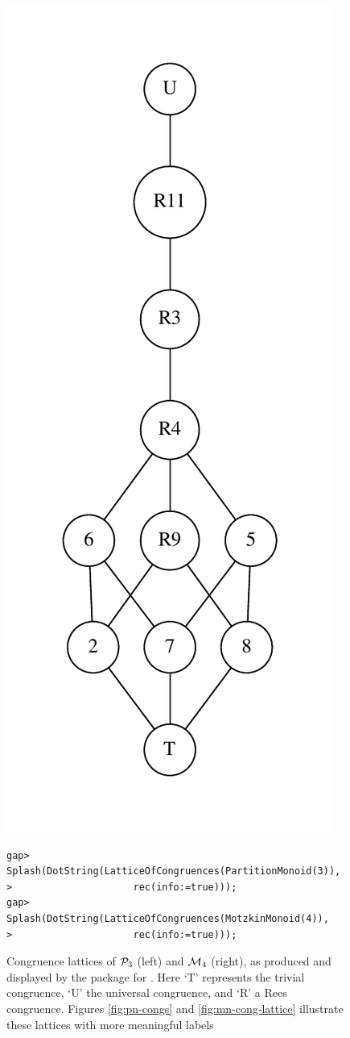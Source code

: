 \begin{figure}[p]
  \includegraphics[scale=0.6]{pics/ch-motzkin/m4-lattice.pdf}
\begin{verbatim}
gap> Splash(DotString(LatticeOfCongruences(PartitionMonoid(3)),
>                     rec(info:=true)));
gap> Splash(DotString(LatticeOfCongruences(MotzkinMonoid(4)),
>                     rec(info:=true)));
\end{verbatim}
  \caption[Congruence lattices of $\Prt_3$ and $\Mot_4$ displayed using \GAP{}]
  {Congruence lattices of $\Prt_3$ (left) and $\Mot_4$ (right), as produced and
    displayed by the \Semigroups{} package for \GAP{}.  Here `T' represents the
    trivial congruence, `U' the universal congruence, and `R' a Rees congruence.
    Figures \ref{fig:pn-congs} and \ref{fig:mn-cong-lattice} illustrate these
    lattices with more meaningful labels}
  \label{fig:gap-lattices}
\end{figure}

